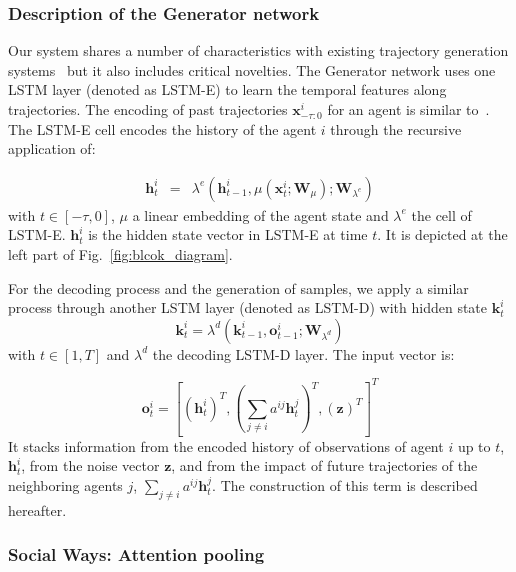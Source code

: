 \documentclass[10pt,twocolumn,letterpaper]{article}
\begin{document}
\vspace{-0.3cm}
\subsubsection{Description of the Generator network}


Our system shares a number of characteristics with existing trajectory generation systems~\cite{SocialGAN2018,SoPhie2018} but it also includes critical novelties. The Generator network uses one LSTM layer (denoted as LSTM-E) to learn the temporal features along trajectories.  The encoding of past trajectories $ \mathbf{x}^i_{-\tau:0}$ for an agent is similar to~\cite{SocialGAN2018}. The LSTM-E cell encodes the history of the agent $i$ through the recursive application of:

\vspace{-0.2cm}
\begin{equation}
\begin{array}{ccc}
\mathbf{h}^i_t&=& \lambda^e(\mathbf{h}^i_{t-1},\mu(\mathbf{x}^i_t;\mathbf W_{\mu}); \mathbf W_{\lambda^e})
\end{array}
\end{equation}
with $t\in[-\tau,0]$, $\mu$ a linear embedding of the agent state and $\lambda^e$ the cell of LSTM-E. $\mathbf{h}^i_t$ is the hidden state vector in LSTM-E at time $t$. It is depicted at the left part of Fig.~\ref{fig:blcok_diagram}.

For the decoding process and the generation of samples, we apply a similar process through another LSTM layer (denoted as LSTM-D) with hidden state $\mathbf{k}^i_{t}$
\begin{equation}
\mathbf{k}^i_{t} = \lambda^d(\mathbf{k}^i_{t-1},\mathbf{o}^i_{t-1}; \mathbf W_{\lambda^d})  
\end{equation}
with $t\in[1,T]$ and $\lambda^d$ the decoding LSTM-D layer. The input vector is:

\begin{equation}
	\mathbf{o}^i_{t}=[(\mathbf{h}^i_{t})^T,(\sum_{j\neq i}a^{ij} \mathbf{h}^j_{t} )^T,(\mathbf z)^T]^T
\end{equation} 
\noindent
It stacks information from the encoded history of observations of agent $i$ up to $t$, $\mathbf{h}^i_t$, from the noise vector $\mathbf z$, and from the impact of future trajectories of the neighboring agents $j$, $\sum_{j\neq i}a^{ij} \mathbf{h}^j_t$. The construction of this term is described hereafter. 

\subsubsection{Social Ways: Attention pooling}
\end{document}
